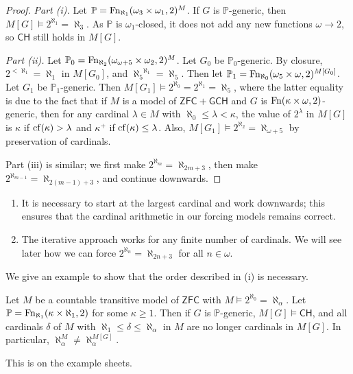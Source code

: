 \begin{proof}
    \emph{Part (i).}
    Let \( \mathbb P = \operatorname{Fn}_{\aleph_1}(\omega_3 \times \omega_1, 2)^M \).
    If \( G \) is \( \mathbb P \)-generic, then \( M[G] \vDash 2^{\aleph_1} = \aleph_3 \).
    As \( \mathbb P \) is \( \omega_1 \)-closed, it does not add any new functions \( \omega \to 2 \), so \( \mathsf{CH} \) still holds in \( M[G] \).

    \emph{Part (ii).}
    Let \( \mathbb P_0 = \operatorname{Fn}_{\aleph_2}(\omega_{\omega + 5} \times \omega_2, 2)^M \).
    Let \( G_0 \) be \( \mathbb P_0 \)-generic.
    By closure, \( 2^{<\aleph_1} = \aleph_1 \) in \( M[G_0] \), and \( {\aleph_5}^{\aleph_1} = \aleph_5 \).
    Then let \( \mathbb P_1 = \operatorname{Fn}_{\aleph_0}(\omega_5 \times \omega, 2)^{M[G_0]} \).
    Let \( G_1 \) be \( \mathbb P_1 \)-generic.
    Then \( M[G_1] \vDash 2^{\aleph_0} = 2^{\aleph_1} = \aleph_5 \), where the latter equality is due to the fact that if \( M \) is a model of \( \mathsf{ZFC} + \mathsf{GCH} \) and \( G \) is \( \operatorname{Fn}(\kappa \times \omega, 2) \)-generic, then for any cardinal \( \lambda \in M \) with \( \aleph_0 \leq \lambda < \kappa \), the value of \( 2^\lambda \) in \( M[G] \) is \( \kappa \) if \( \operatorname{cf}(\kappa) > \lambda \) and \( \kappa^+ \) if \( \operatorname{cf}(\kappa) \leq \lambda \).
    Also, \( M[G_1] \vDash 2^{\aleph_2} = \aleph_{\omega + 5} \) by preservation of cardinals.

    Part (iii) is similar; we first make \( 2^{\aleph_m} = \aleph_{2m+3} \), then make \( 2^{\aleph_{m-1}} = \aleph_{2(m-1)+3} \), and continue downwards.
\end{proof}
\begin{remark}
    \begin{enumerate}
        \item It is necessary to start at the largest cardinal and work downwards; this ensures that the cardinal arithmetic in our forcing models remains correct.
        \item The iterative approach works for any finite number of cardinals.
        We will see later how we can force \( 2^{\aleph_n} = \aleph_{2n + 3} \) for all \( n \in \omega \).
    \end{enumerate}
\end{remark}
We give an example to show that the order described in (i) is necessary.
\begin{proposition}
    Let \( M \) be a countable transitive model of \( \mathsf{ZFC} \) with \( M \vDash 2^{\aleph_0} = \aleph_\alpha \).
    Let \( \mathbb P = \operatorname{Fn}_{\aleph_1}(\kappa \times \aleph_1, 2) \) for some \( \kappa \geq 1 \).
    Then if \( G \) is \( \mathbb P \)-generic, \( M[G] \vDash \mathsf{CH} \), and all cardinals \( \delta \) of \( M \) with \( \aleph_1 \leq \delta \leq \aleph_\alpha \) in \( M \) are no longer cardinals in \( M[G] \).
    In particular, \( \aleph_\alpha^M \neq \aleph_\alpha^{M[G]} \).
\end{proposition}
This is on the example sheets.

